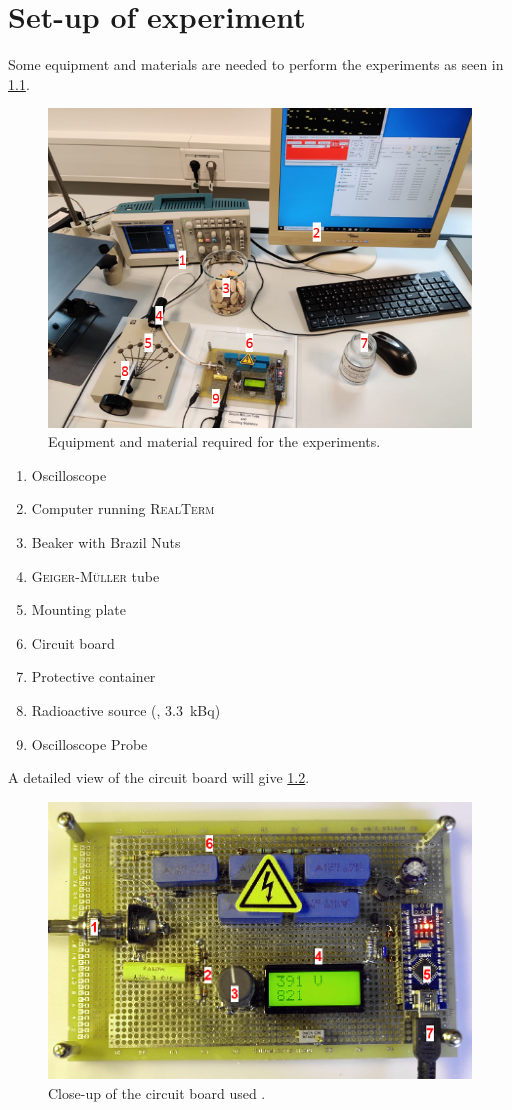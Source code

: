 \chapter{Set-up of experiment}
%
Some equipment and materials are needed to perform the experiments as seen in \cref{fig:setup}.
%
\begin{figure}[h]
	\centering
	\includegraphics[width=.9\textwidth]{aufbau/setup.PNG} %
	\caption[Equipment used.]{Equipment and material required for the experiments.}
	\label{fig:setup} 
\end{figure}
%
\begin{enumerate}
	\item Oscilloscope
	\item Computer running \textsc{RealTerm}
	\item Beaker with Brazil Nuts
	\item \textsc{Geiger-Müller} tube
	\item Mounting plate
	\item Circuit board
	\item Protective container
	\item Radioactive source (, \SI[]{3.3}[]{kBq})
	\item Oscilloscope Probe
\end{enumerate}\par\medskip
%
A detailed view of the circuit board will give \cref{fig:circuit_board}.
%
\begin{figure}[H]
	\includegraphics[width=.9\textwidth]{aufbau/circuit_board.png}
	\caption[Close-up of the electronics]{Close-up of the circuit board used \cite[]{AlexanderDorr.GMT}.}
	\label{fig:circuit_board}
\end{figure}
